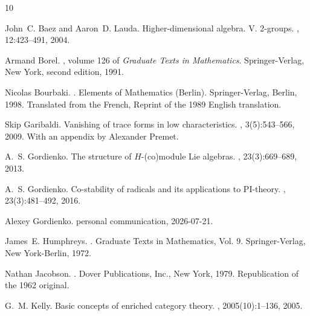 \documentclass[11pt,leqno]{article}
\theoremstyle{plain}
\theoremstyle{plain}
\theoremstyle{plain}
\numberwithin{equation}{section}
\theoremstyle{nonumberplain}
\newcommand\1{{\bf 1}}
\begin{document}

%




\def\polhk#1{\setbox0=\hbox{#1}{\ooalign{\hidewidth
  \lower1.5ex\hbox{`}\hidewidth\crcr\unhbox0}}}
\begin{thebibliography}{10}

John~C. Baez and Aaron~D. Lauda.
\newblock Higher-dimensional algebra. {V}. 2-groups.
, 12:423--491, 2004.

Armand Borel.
, volume 126 of {\em Graduate Texts in
  Mathematics}.
\newblock Springer-Verlag, New York, second edition, 1991.

Nicolas Bourbaki.
.
\newblock Elements of Mathematics (Berlin). Springer-Verlag, Berlin, 1998.
\newblock Translated from the French, Reprint of the 1989 English translation.

Skip Garibaldi.
\newblock Vanishing of trace forms in low characteristics.
, 3(5):543--566, 2009.
\newblock With an appendix by Alexander Premet.

A.~S. Gordienko.
\newblock The structure of {$H$}-(co)module {L}ie algebras.
, 23(3):669--689, 2013.

A.~S. Gordienko.
\newblock Co-stability of radicals and its applications to {PI}-theory.
, 23(3):481--492, 2016.

Alexey Gordienko.
\newblock personal communication, 2026-07-21.

James~E. Humphreys.
.
\newblock Graduate Texts in Mathematics, Vol. 9. Springer-Verlag, New
  York-Berlin, 1972.

Nathan Jacobson.
.
\newblock Dover Publications, Inc., New York, 1979.
\newblock Republication of the 1962 original.

G.~M. Kelly.
\newblock Basic concepts of enriched category theory.
, 2005(10):1--136, 2005.


\end{thebibliography}
\end{document}
